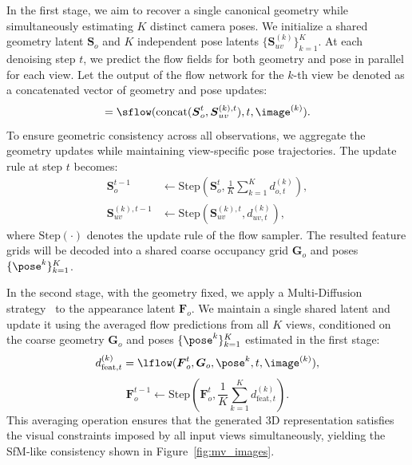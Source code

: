 \documentclass[../../book-main.tex]{subfiles}
\begin{document}
In the first stage, we aim to recover a single canonical geometry
while simultaneously estimating $K$ distinct camera poses. We
initialize a shared geometry latent $\boldsymbol{S}_{o}$ and $K$
independent pose latents $\{ \boldsymbol{S}_{uv}^{(k)} \}_{k=1}^K$.
At each denoising step $t$, we predict the flow fields for both
geometry and pose in parallel for each view. Let the output of the
flow network for the $k$-th view be denoted as a concatenated vector
of geometry and pose updates:
\begin{equation}
[d_{o, t}^{(k)}, d_{uv, t}^{(k)}] =
\sflow(\text{concat}(\boldsymbol{S}_{o}^t, \boldsymbol{S}_{uv}^{(k),
t}), t, \image^{(k)}).
\end{equation}
To ensure geometric consistency across all observations, we aggregate
the geometry updates while maintaining view-specific pose
trajectories. The update rule at step $t$ becomes:
\begin{align}
\boldsymbol{S}_{o}^{t-1} &\leftarrow
\text{Step}\left(\boldsymbol{S}_{o}^{t}, \frac{1}{K} \sum_{k=1}^K
d_{o, t}^{(k)}\right), \\
\boldsymbol{S}_{uv}^{(k), t-1} &\leftarrow
\text{Step}\left(\boldsymbol{S}_{uv}^{(k), t}, d_{uv, t}^{(k)}\right),
\end{align}
where $\text{Step}(\cdot)$ denotes the update rule of the flow
sampler. The resulted feature grids will be decoded into a shared
coarse occupancy grid $\boldsymbol{G}_o$ and poses $\{\pose^{k}\}_{k=1}^{K}$.

In the second stage, with the geometry fixed, we apply a
Multi-Diffusion strategy~\citep{bar2023multidiffusion} to the
appearance latent $\boldsymbol{F}_{o}$. We maintain a single shared
latent and update it using the averaged flow predictions from all $K$
views, conditioned on the coarse geometry $\boldsymbol{G}_o$ and
poses $\{\pose^{k}\}_{k=1}^{K}$ estimated in the first stage:
\begin{equation}
d_{\text{feat}, t}^{(k)} = \lflow(\boldsymbol{F}_{o}^t,
\boldsymbol{G}_o, \pose^{k}, t, \image^{(k)}),
\end{equation}
\begin{equation}
\boldsymbol{F}_{o}^{t-1} \leftarrow
\text{Step}\left(\boldsymbol{F}_{o}^{t}, \frac{1}{K} \sum_{k=1}^K
d_{\text{feat}, t}^{(k)}\right).
\end{equation}
This averaging operation ensures that the generated 3D representation
satisfies the visual constraints imposed by all input views
simultaneously, yielding the SfM-like consistency shown in
Figure~\ref{fig:mv_images}.
\end{document}
